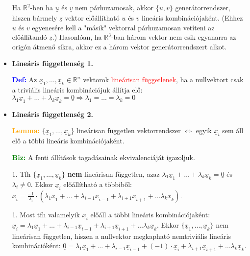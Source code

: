 \documentclass[../../szobeli.tex]{subfiles}
\begin{document}
\begin{itemize}
            Ha $\mathbb{R}^2$-ben ha $\underline{u}$ és $\underline{v}$ nem párhuzamosak, akkor $\{\underline{u,v}\}$ generátorrendszer, hiszen bármely $\underline{z}$ vektor előállítható \underline{$u$} és \underline{$v$} lineáris kombinációjaként. (Ehhez \underline{$u$} és \underline{$v$} egyenesére kell a "másik" vektorral párhuzamosan vetíteni az előállítandó $\underline{z}$.) Hasonlóan, ha $\mathbb{R}^3$-ban három vektor nem esik egyanarra az origón átmenő síkra, akkor ez a három vektor generátorrendszert alkot.

        \item \textbf{Lineáris függetlenség 1.}
        
            \textcolor{blue}{\textbf{Def:}} Az $\underline{x}_1, \dots, \underline{x}_k \in \mathbb{R}^n$ vektorok \textcolor{red}{lineárisan függetlenek}, ha a nullvektort csak a triviális lineáris kombinációjuk állítja elő: $\lambda_1 \underline{x}_1 + \dots + \lambda_k \underline{x}_k = \underline{0} \Rightarrow \lambda_1 = \dots = \lambda_k = 0$

            

        \item \textbf{Lineáris függetlenség 2.}
        
            \textcolor{orange}{\textbf{Lemma:}} $\{\underline{x}_1, \ldots, \underline{x}_k\}$ lineárisan független vektorrendszer $\Longleftrightarrow$ egyik $\underline{x}_i$ sem áll elő a többi lineáris kombinációjaként.
            
            \textcolor{green}{\textbf{Biz:}} A fenti állítások tagadásainak ekvivalenciáját igazoljuk.
            
            1. Tfh $\{\underline{x}_1, \ldots, \underline{x}_k\}$ \textbf{nem} lineárisan független, azaz $\lambda_1 \underline{x}_1+\ldots+\lambda_k \underline{x}_k=\underline{0}$ és $\lambda_i \neq 0$. Ekkor $\underline{x}_i$ előállítható a többiből:
            $\underline{x}_i=\frac{-1}{\lambda_i} \cdot(\lambda_1 \underline{x}_1+\ldots+\lambda_{i-1} \underline{x}_{i-1}+\lambda_{i+1} \underline{x}_{i+1}+\ldots \lambda_k \underline{x}_k)$.

            1. Most tfh valamelyik $\underline{x}_i$ előáll a többi lineáris kombinációjaként: $\underline{x}_i=\lambda_1 \underline{x}_1+\ldots+\lambda_{i-1} \underline{x}_{i-1}+\lambda_{i+1} \underline{x}_{i+1}+\ldots \lambda_k \underline{x}_k$. Ekkor $\{\underline{x}_1, \ldots, \underline{x}_k\}$ nem lineárisan független, hiszen a nullvektor megkapható nemtriviális lineáris kombinációként: $\underline{0}=\lambda_1 \underline{x}_1+\ldots+\lambda_{i-1} \underline{x}_{i-1}+(-1) \cdot \underline{x}_i+\lambda_{i+1} \underline{x}_{i+1}+\ldots \lambda_k \underline{x}_k$.
    \end{itemize}
\end{document}
